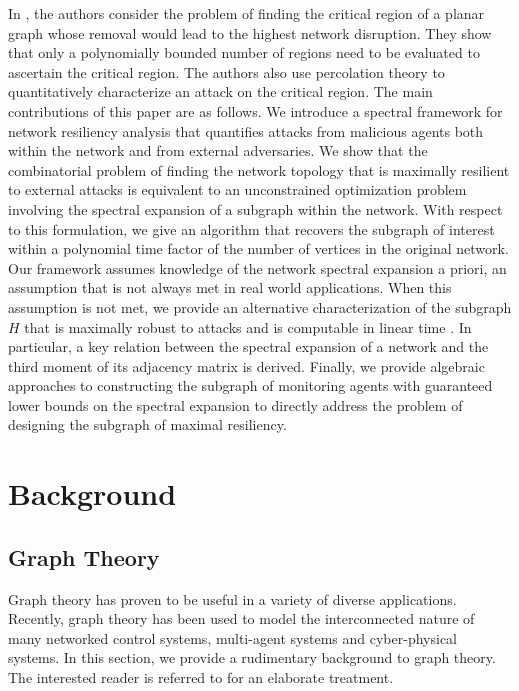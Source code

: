 \documentclass{amsart}
\theoremstyle{definition}
\theoremstyle{remark}
\numberwithin{equation}{section}
\begin{document}
In \cite{Van2013}, the authors consider the problem of finding the critical region of a planar graph whose removal would lead to the highest network disruption. They show that only a polynomially bounded number of regions need to be evaluated to ascertain the critical region. The authors also use percolation theory to quantitatively characterize an attack on the critical region.   
\medskip
The main contributions of this paper are as follows. We introduce a spectral framework for network resiliency analysis that quantifies attacks from malicious agents both within the network and from external adversaries. We show that the combinatorial problem of finding the network topology that is maximally resilient to external attacks is equivalent to an unconstrained optimization problem involving the spectral expansion of a subgraph within the network. With respect to this formulation, we give an algorithm that recovers the subgraph of interest within a polynomial time factor of the number of vertices in the original network. Our framework assumes knowledge of the network spectral expansion a priori, an assumption that is not always met in real world applications. When this assumption is not met, we provide an alternative characterization of the subgraph $H$ that is maximally robust to attacks and is computable in linear time \cite{Sesh2015,Sesh2012,Tsour2011,Tsour2009}. In particular, a key relation between the spectral expansion of a network and the third moment of its adjacency matrix is derived. Finally, we provide algebraic approaches to constructing the subgraph of monitoring agents with guaranteed lower bounds on the spectral expansion to directly address the problem of designing the subgraph of maximal resiliency. 

\section{Background}
\subsection{Graph Theory}
Graph theory has proven to be useful in a variety of diverse applications. Recently, graph theory has been used to model the interconnected nature of many networked control systems, multi-agent systems and cyber-physical systems. In this section, we provide a rudimentary background to graph theory. The interested reader is referred to \cite{Dies} for an elaborate treatment.
\end{document}
